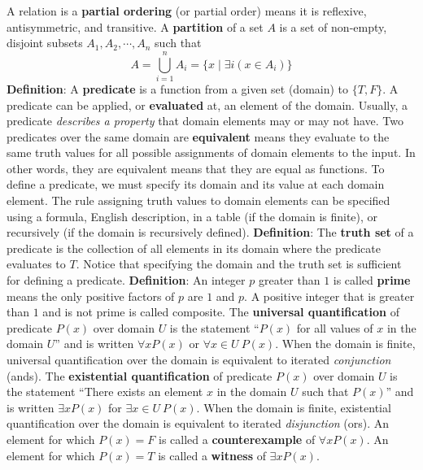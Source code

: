 \documentclass[12pt, oneside]{article}
\begin{document}
A relation is a {\bf partial ordering} (or partial order) means 
it is reflexive, antisymmetric, and transitive.
A {\bf partition} of a set $A$ is a set of non-empty, disjoint subsets 
$A_1, A_2, \cdots, A_n$ such that 
\[
    A = \bigcup_{i=1}^{n} A_i = \{ x \mid \exists i (x \in A_i) \}
\]
{\bf  Definition}: A  {\bf predicate}  is  a function from a given set (domain) to $\{T,F\}$.
A predicate can be applied, or {\bf evaluated} at, an element of the domain.
Usually, a predicate {\it describes a  property} that domain elements may or may not have.
Two predicates over the same domain are {\bf equivalent} means they evaluate to
the same truth values for all possible assignments of domain elements to the
input. In other words, they are equivalent means that they are equal as functions.
To define a predicate, we must specify its domain and its value at each domain element.
The rule assigning truth values to domain elements can be specified using a formula, 
English description, in a table (if the domain is finite), or recursively (if the domain is recursively
defined).
{\bf Definition}: The {\bf truth  set} of a  predicate is the collection of all elements in its
domain where the predicate evaluates to $T$.
Notice that specifying the domain and the truth set is sufficient for defining
a predicate.
{\bf Definition}:  An integer $p$ greater than $1$ is called {\bf prime} means 
the only positive factors of 
$p$ are $1$ and $p$. A positive integer that is greater than $1$ and is not prime 
is called composite.
The {\bf universal quantification} of predicate $P(x)$ over
domain $U$ is the statement ``$P(x)$ for all values of $x$ in the domain $U$''
and is written $\forall x P(x)$ or $\forall x \in U ~P(x)$. 
When the domain is finite, universal quantification over the domain 
is equivalent to iterated {\it conjunction} (ands).
The {\bf existential quantification} of predicate $P(x)$ 
over domain $U$ is the statement ``There exists an element $x$ 
in the domain $U$ such that $P(x)$'' and is written $\exists x P(x)$
for $\exists x \in U ~P(x)$. 
When the domain is finite, existential quantification over the domain 
is equivalent to iterated {\it disjunction} (ors).
An element for which $P(x) = F$ is called a {\bf counterexample} of $\forall x P(x)$.
An element for which $P(x) = T$ is called a {\bf witness} of $\exists x P(x)$.
\end{document}
